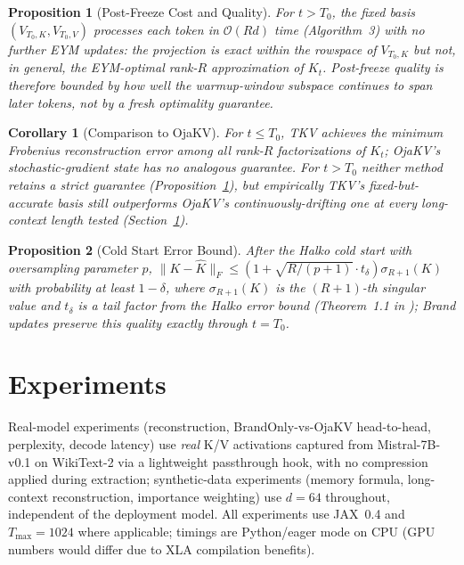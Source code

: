 \documentclass{article}
\newtheorem{proposition}{Proposition}
\newtheorem{corollary}{Corollary}
\begin{document}
\begin{proposition}[Post-Freeze Cost and Quality]
\label{prop:postfreeze}
For $t > T_0$, the fixed basis $(V_{T_0,K}, V_{T_0,V})$ processes each token
in $\mathcal{O}(Rd)$ time (Algorithm~3) with no further EYM updates: the
projection is exact within the rowspace of $V_{T_0,K}$ but not, in general,
the EYM-optimal rank-$R$ approximation of $K_t$. Post-freeze quality is
therefore bounded by how well the warmup-window subspace continues to span
later tokens, not by a fresh optimality guarantee.
\end{proposition}

\begin{corollary}[Comparison to OjaKV]
For $t \leq T_0$, TKV achieves the minimum Frobenius reconstruction error
among all rank-$R$ factorizations of $K_t$; OjaKV's stochastic-gradient
state has no analogous guarantee. For $t > T_0$ neither method retains a
strict guarantee (Proposition~\ref{prop:postfreeze}), but empirically TKV's
fixed-but-accurate basis still outperforms OjaKV's continuously-drifting one
at every long-context length tested (Section~\ref{sec:experiments}).
\end{corollary}

\begin{proposition}[Cold Start Error Bound]
After the Halko cold start with oversampling parameter $p$,
$\| K - \hat{K} \|_F \leq
  \left(1 + \sqrt{R/(p+1)} \cdot t_\delta \right) \sigma_{R+1}(K)$
with probability at least $1-\delta$, where $\sigma_{R+1}(K)$ is the
$(R+1)$-th singular value and $t_\delta$ is a tail factor from the Halko
error bound (Theorem~1.1 in \citep{halko2011}); Brand updates preserve this
quality exactly through $t = T_0$.
\end{proposition}

\section{Experiments}
\label{sec:experiments}

Real-model experiments (reconstruction, BrandOnly-vs-OjaKV head-to-head,
perplexity, decode latency) use \emph{real} K/V activations captured from
Mistral-7B-v0.1 \citep{mistral2023} on WikiText-2 \citep{merity2017} via a
lightweight passthrough hook, with no
compression applied during extraction; synthetic-data experiments (memory
formula, long-context reconstruction, importance weighting) use $d=64$
throughout, independent of the deployment model.  All experiments use
JAX~0.4 \citep{jax2018} and $T_{\max}=1024$ where applicable; timings are Python/eager
mode on CPU (GPU numbers would differ due to XLA compilation benefits).
\end{document}
